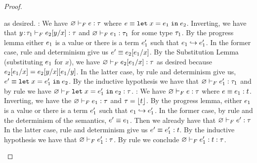 \begin{proof}
\begin{itemize}
    as desired.
    \pfcase{\fLet}: We have 
    $\hasftype{\varnothing}{\sexpr}{\sftype}$ where
    $\sexpr \equiv \eletin{x}{\sexpr_1}{\sexpr_2}$. Inverting,
    we have that 
    $\hasftype{\bind{y}{\sftype_1}}{\subst{\sexpr_2}{x}{y}}{\sftype}$
    and $\hasftype{\varnothing}{\sexpr_1}{\sftype_1}$
    for some type $\sftype_1$. 
    By the progress lemma either $\sexpr_1$ is a value
    or there is a term $\sexpr'_1$ such that $\sexpr_1 \step \sexpr'_1$.
    In the former case, rule \eLetV and determinism give us
    $\sexpr' \equiv \subst{\sexpr_2}{x}{\sexpr_1}$.
    By the Substitution Lemma (substituting $\sexpr_1$ for $x$), 
    we have $\hasftype{\varnothing}{\subst{\sexpr_2}{x}{\sexpr_1}}{\sftype}$
    as desired because 
    $\subst{\sexpr_2}{x}{\sexpr_1} = \subst{\subst{\sexpr_2}{x}{y}}{y}{\sexpr_1}$.
    In the latter case, by rule \eLet and determinism give us, 
    $\sexpr' \equiv \eletin{x}{\sexpr'_1}{\sexpr_2}$.
    By the inductive hypothesis we have that 
    $\hasftype{\varnothing}{\sexpr'_1}{\sftype_1}$ and by rule \fLet 
    we have $\hasftype{\varnothing}{\eletin{x}{\sexpr'_1}{\sexpr_2}}{\sftype}$. 
    \pfcase{\fAnn}: We have 
    $\hasftype{\varnothing}{\sexpr}{\sftype}$ where
    $\sexpr \equiv \tyann{\sexpr_1}{\stype}$. Inverting,
    we have the $\hasftype{\varnothing}{\sexpr_1}{\sftype}$ and
    $\sftype = \forgetreft{\stype}$. 
    By the progress lemma, either $\sexpr_1$ is a value
    or there is a term $\sexpr'_1$ such that $\sexpr_1 \step \sexpr'_1$.
    In the former case, by rule \eAnnV and the determinism of the semantics, 
    $\sexpr' \equiv \sexpr_1$. Then we already have that
    $\hasftype{\varnothing}{\sexpr'}{\sftype}$
    In the latter case, rule \eAnn and determinism give us 
    $\sexpr' \equiv \tyann{\sexpr'_1}{\stype}$. By the inductive hypothesis
    we have that $\hasftype{\varnothing}{\sexpr'_1}{\sftype}$. By rule
    \fAnn we conclude $\hasftype{\varnothing}{\tyann{\sexpr'_1}{\stype}}{\sftype}$.
    \end{itemize}
\end{proof}

